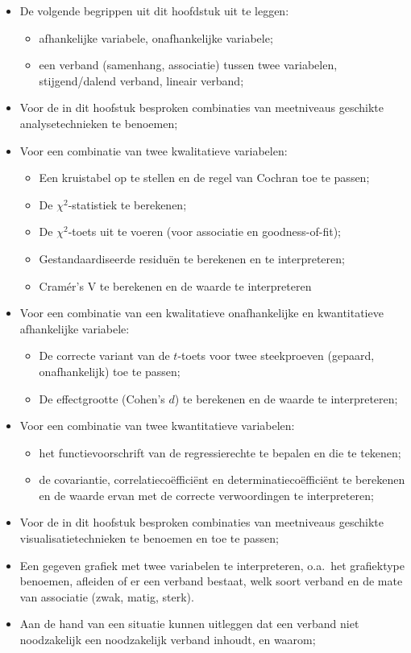 \begin{itemize}
  \item De volgende begrippen uit dit hoofdstuk uit te leggen:
  \begin{itemize}
    \item afhankelijke variabele, onafhankelijke variabele;
    \item een verband (samenhang, associatie) tussen twee variabelen, stijgend/dalend verband, lineair verband;
  \end{itemize}
  \item Voor de in dit hoofstuk besproken combinaties van meetniveaus geschikte analysetechnieken te benoemen;
  \item Voor een combinatie van twee kwalitatieve variabelen:
  \begin{itemize}
    \item Een kruistabel op te stellen en de regel van Cochran toe te passen;
    \item De $\chi^2$-statistiek te berekenen;
    \item De $\chi^2$-toets uit te voeren (voor associatie en goodness-of-fit);
    \item Gestandaardiseerde residuën te berekenen en te interpreteren;
    \item Cramér's V te berekenen en de waarde te interpreteren
  \end{itemize}
  \item Voor een combinatie van een kwalitatieve onafhankelijke en kwantitatieve afhankelijke variabele:
  \begin{itemize}
    \item De correcte variant van de $t$-toets voor twee steekproeven (gepaard, onafhankelijk) toe te passen;
    \item De effectgrootte (Cohen's $d$) te berekenen en de waarde te interpreteren;
  \end{itemize}
  \item Voor een combinatie van twee kwantitatieve variabelen:
  \begin{itemize}
    \item het functievoorschrift van de regressierechte te bepalen en die te tekenen;
    \item de covariantie, correlatiecoëfficiënt en determinatiecoëfficiënt te berekenen en de waarde ervan met de correcte verwoordingen te interpreteren;
  \end{itemize}
  \item Voor de in dit hoofstuk besproken combinaties van meetniveaus geschikte visualisatietechnieken te benoemen en toe te passen;
  \item Een gegeven grafiek met twee variabelen te interpreteren, o.a.~het grafiektype benoemen, afleiden of er een verband bestaat, welk soort verband en de mate van associatie (zwak, matig, sterk).
  \item Aan de hand van een situatie kunnen uitleggen dat een verband niet noodzakelijk een noodzakelijk verband inhoudt, en waarom;
\end{itemize}

